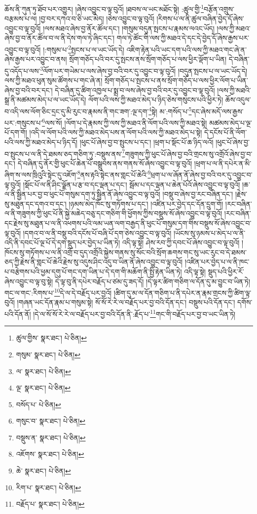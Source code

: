 ཆོས་ནི་ཀུན་ཏུ་ཐོབ་པར་འགྱུར། །ཞེས་འབྱུང་བ་ལྟ་བུའོ། །ཐབས་ལ་ཡང་མཐོང་སྟེ། :ཚུལ་གྱི་\footnote{ཚུལ་གྱིས་  སྣར་ཐང་།  པེ་ཅིན། }བརྩོན་འགྲུས་བརྩམས་པ་ལ། །བྱ་བར་དཀའ་བ་ཅི་ཡང་མེད། །ཅེས་འབྱུང་བ་ལྟ་བུའོ། །རིགས་པ་ལ་ནི་ཚུལ་བཞིན་བྱེད་དོ་ཞེས་འབྱུང་བ་ལྟ་བུའོ། །ལས་མཐའ་ཞེས་བྱ་ནོར་ཚོལ་དང་། །གསུམ་བདུན་སྤངས་པ་རྣམས་ལའང་ཡོད། །ལས་ཀྱི་མཐའ་ཞེས་བྱ་བ་ནོར་ཚོལ་བ་ལ་ནི་དེས་གལ་ཏེ་ཞིང་དང་། གལ་ཏེ་ཚོང་གི་ལས་ཀྱི་མཐའ་དེ་དང་དེ་བྱེད་དོ་ཞེས་རྒྱས་པར་འབྱུང་བ་ལྟ་བུའོ། །:གསུམ་པ་\footnote{གསུམ་  སྣར་ཐང་།  པེ་ཅིན། }སྤངས་པ་ལ་ཡང་ཡོད་དེ། འཇིག་རྟེན་པའི་ཡང་དག་པའི་ལས་ཀྱི་མཐའ་གང་ཞེ་ན་ཞེས་རྒྱས་པར་འབྱུང་བ་ནས། སྲོག་གཅོད་པའི་བར་དུ་སྤངས་ནས་སྲོག་གཅོད་པ་ལས་ཕྱིར་ལྡོག་པ་ཡིན། དེ་བཞིན་དུ་འདོད་པ་ལས་\footnote{ལ་  སྣར་ཐང་།  པེ་ཅིན། }ལོག་པར་གཡེམ་པ་ལས་ཞེས་བྱ་བའི་བར་དུ་འབྱུང་བ་ལྟ་བུའོ། །བདུན་སྤངས་པ་ལ་ཡང་ཡོད་དེ། ལས་ཀྱི་མཐའ་ཕུན་སུམ་ཚོགས་པ་གང་ཞེ་ན། སྲོག་གཅོད་པ་སྤངས་པ་ནས་སྲོག་གཅོད་པ་ལས་ཕྱིར་ལོག་པ་ཡིན་ཞེས་བྱ་བའི་བར་དང་། དེ་བཞིན་དུ་ཚིག་འཁྱལ་པ་སྨྲ་བ་ལས་ཞེས་བྱ་བའི་བར་དུ་འབྱུང་བ་ལྟ་བུའོ། །ལས་ཀྱི་མཐའི་སྒྲ་ནི་མཚམས་མེད་པ་ལ་ཡང་ཡོད་དེ། ལོག་པའི་ལས་ཀྱི་མཐའ་མེད་པ་ཉིད་ཅེས་གསུངས་པའི་ཕྱིར་ཏེ། ཆོས་འདུལ་བ་འདི་ལས་ལོག་ཅིང་དྲང་དུ་མི་རུང་བ་རྣམས་ནི་གང་ཟག་:ལྔ་དག་\footnote{ལྔ་  སྣར་ཐང་།  པེ་ཅིན། }སྟེ། མ་:གསོད་པ་\footnote{བསོད་པ་  པེ་ཅིན། }དང་ཞེས་མདོ་ལས་རྒྱས་པར་:གསུངས་པ་\footnote{གསུང་བ་  སྣར་ཐང་།  པེ་ཅིན། }ལས་སོ། །ལོག་པ་དེ་རྣམས་ཀྱི་ལས་ཀྱི་མཐའ་ནི་ལོག་པའི་ལས་ཀྱི་མཐའ་སྟེ། མཚམས་མེད་པ་ལྔ་པོ་དག་གོ། །འདི་ལ་ལོག་པའི་ལས་ཀྱི་མཐའ་མེད་པས་ན་ལོག་པའི་ལས་ཀྱི་མཐའ་མེད་པ་སྟེ། དེ་དངོས་པོ་ནི་ལོག་པའི་ལས་ཀྱི་མཐའ་མེད་པ་ཉིད་དོ། །ཕུང་པོ་ཞེས་བྱ་བ་སྤུངས་པ་དང་། །ཕྲག་པ་སྡོང་པོ་ཆ་ཉིད་ལའོ། །ཕུང་པོ་ཞེས་བྱ་བ་སྤུངས་པ་ལ་ནི་དེ་ཐམས་ཅད་གཅིག་ཏུ་:བསྡུས་ནས་\footnote{བསྡུས་ན་  སྣར་ཐང་།  པེ་ཅིན། }གཟུགས་ཀྱི་ཕུང་པོ་ཞེས་བྱ་བའི་གྲངས་སུ་འགྲོའོ་ཞེས་བྱ་བ་དང་། དེ་བཞིན་དུ་ནོར་གྱི་ཕུང་པོ་ཆེན་པོ་བསྒྲུབས་ནས་གནས་སོ་ཞེས་འབྱུང་བ་ལྟ་བུའོ། །ཕྲག་པ་ལ་ནི་དཔེར་ན་མི་ཞིག་ས་ལས་ཁྲིའུའི་སྟེང་དུ་འཇོག་\footnote{འཇོགས་  སྣར་ཐང་།  པེ་ཅིན། }ནས་རྟའི་སྟེང་ནས་གླང་པོ་ཆེའི་\footnote{ཆེ་  སྣར་ཐང་།  པེ་ཅིན། }ཕྲག་པ་ལ་ཞོན་ནོ་ཞེས་བྱ་བའི་བར་དུ་འབྱུང་བ་ལྟ་བུའོ། །སྡོང་པོ་ལ་ནི་ཤིང་ལྗོན་པ་རྩ་བ་དང་ལྡན་པ་དང་། སྦོམ་པ་དང་ལྡན་པ་ཆེན་པོའོ་ཞེས་འབྱུང་བ་ལྟ་བུའོ། །ཆ་ལ་ནི་སྦྱིན་པར་བྱ་བ་ཕུང་པོ་གསུམ་དག་ཏུ་སྦྱིན་ནོ་ཞེས་འབྱུང་བ་ལྟ་བུའོ། །བསྡུ་བ་ཞེས་བྱ་རང་བཞིན་དང་། །རྗེས་སུ་མཐུན་དང་དགའ་བ་དང་། །ཉམས་མེད་ཁོང་སུ་གཏོགས་པ་དང་། །འཛིན་པར་བྱེད་དང་དོན་དྲུག་གོ། །རང་བཞིན་ལ་ནི་གཟུགས་ཀྱི་ཕུང་པོ་ནི་སྐྱེ་མཆེད་བཅུ་དང་གཅིག་གི་ཕྱོགས་ཀྱིས་བསྡུས་སོ་ཞེས་འབྱུང་བ་ལྟ་བུའོ། །རང་བཞིན་དང་རྗེས་སུ་མཐུན་པ་ལ་ནི་འཕགས་པའི་ལམ་ཡན་ལག་བརྒྱད་ནི་ཕུང་པོ་གསུམ་དག་གིས་བསྡུས་སོ་ཞེས་འབྱུང་བ་ལྟ་བུའོ། །དགའ་བ་ལ་ནི་བསྡུ་བའི་དངོས་པོ་བཞི་པོ་དག་ཅེས་འབྱུང་བ་ལྟ་བུའོ། །ཡོངས་སུ་ཉམས་པ་མེད་པ་ལ་ནི་འདི་ནི་དབང་པོ་ལྔ་པོ་དེ་དག་སྡུད་པར་བྱེད་པ་ཡིན་ཏེ། འདི་ལྟ་སྟེ། ཤེས་རབ་ཀྱི་དབང་པོ་ཞེས་འབྱུང་བ་ལྟ་བུའོ། །ཁོངས་སུ་གཏོགས་པ་ལ་ནི་འགྲོ་བ་དུད་འགྲོའི་སྐྱེས་གནས་སུ་སོང་བའི་སྲོག་ཆགས་གང་སུ་ཡང་རུང་བ་དེ་ཐམས་ཅད་ཀྱི་རྗེས་ནི་གླང་པོ་ཆེའི་རྗེས་སུ་འདུས་ཤིང་འདུ་བ་ཡིན་ནོ་ཞེས་འབྱུང་བ་ལྟ་བུའོ། །འཛིན་པར་བྱེད་པ་ལ་ནི་ཁང་པ་བརྩེགས་པའི་ཕྱམ་དགུ་པོ་གང་དག་ཡིན་པ་དེ་དག་གི་མཆོག་ནི་སྤྱི་རྟེན་ཡིན་ཏེ། འདི་ལྟ་སྟེ། སྡུད་པའི་ཕྱིར་རོ་ཞེས་འབྱུང་བ་ལྟ་བུ་སྟེ། དེ་ལྟ་བུ་ནི་དཔེར་བརྗོད་པ་ཙམ་དུ་ཟད་དོ། །དེ་ལྟར་ཚིག་གཅིག་ལ་དོན་དུ་མ་བྱུང་བ་ཡིན་ཏེ། གང་ལ་གང་:རིགས་པ་\footnote{རིག་པ་  སྣར་ཐང་།  པེ་ཅིན། }དེ་ལ་དེ་བརྗོད་པར་བྱའོ། །ཚིག་དུ་མ་ལ་དོན་གཅིག་པ་ནི་དཔེར་ན་རྣམ་གྲངས་ཀྱི་ཚིག་ལྟ་བུའོ། །གཞན་ཡང་དོན་རྣམ་པ་གསུམ་སྟེ། སོ་སོ་རེ་རེ་ལ་བརྗོད་པར་བྱ་བའི་དོན་དང་། བསྡུས་པའི་དོན་དང་། དགོས་པའི་དོན་ནོ། །དེ་ལ་སོ་སོ་རེ་རེ་ལ་བརྗོད་པར་བྱ་བའི་དོན་ནི་:རྗོད་པ་\footnote{བརྗོད་པ་  སྣར་ཐང་།  པེ་ཅིན། }གང་གི་བརྗོད་པར་བྱ་བ་ཡང་ཡིན་ཏེ། 